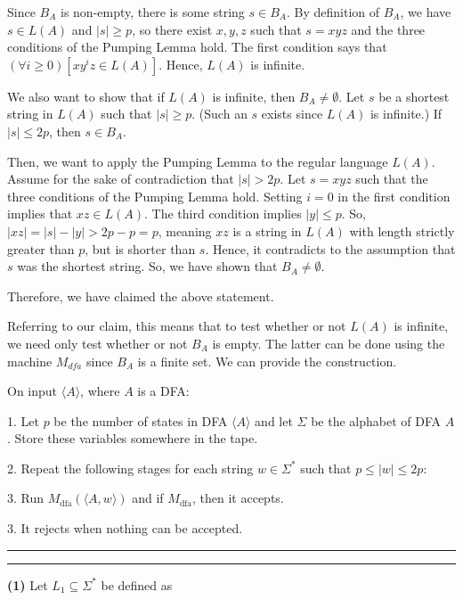 \documentclass[a4paper, 11pt]{article}
\newcommand{\question}[2] {\vspace{.25in} \hrule\vspace{0.5em}
	\noindent{\bf #1: #2} \vspace{0.5em}
	\hrule \vspace{.10in}}
\renewcommand{\part}[1] {\vspace{.10in} {\bf (#1)}}
\newcommand\tab[1][1cm]{\hspace*{#1}}
\begin{document}
	Since $B_A$ is non-empty, there is some string $s \in B_A$. By definition of $B_A$, we have $s \in L(A)$ and $|s| \geq p$, so there exist $x,y,z$ such that $s = xyz$ and the three conditions of the Pumping Lemma hold. The first condition says that $(\forall i \geq 0)[xy^iz \in L(A)]$. Hence, $L(A)$ is infinite.
	
	We also want to show that if $L(A)$ is infinite, then $B_A \neq \emptyset$. Let $s$ be a shortest string in $L(A)$ such that $|s| \geq p$. (Such an $s$ exists since $L(A)$ is infinite.) If $|s| \leq 2p$, then $s \in B_A$. 
	
	Then, we want to apply the Pumping Lemma to the regular language $L(A)$. Assume for the sake of contradiction that $|s| > 2p$. Let $s = xyz$ such that the three conditions of the Pumping Lemma hold. Setting $i = 0$ in the first condition implies that $xz \in L(A)$. The third condition implies $|y| \leq p$. So, $|xz| = |s| - |y| > 2p - p = p$, meaning $xz$ is a string in $L(A)$ with length strictly greater than $p$, but is shorter than $s$. Hence, it contradicts to the assumption that $s$ was the shortest string. So, we have shown that $B_A \neq \emptyset$. 
	
	Therefore, we have claimed the above statement.
	
	Referring to our claim, this means that to test whether or not $L(A)$ is infinite, we need only test whether or not $B_A$ is empty. The latter can be done using the machine $M_{dfa}$ since $B_A$ is a finite set. We can provide the construction. 
	
	On input $\langle A \rangle$, where $A$ is a DFA:
	
	1. Let $p$ be the number of states in DFA $\langle A \rangle$ and let $\Sigma$ be the alphabet of DFA $A$. Store these variables somewhere in the tape.
	
	2. Repeat the following stages for each string $w \in \Sigma^*$ such that $p \leq |w| \leq 2p$:
	
	\tab	3. Run $M_{\text{dfa}}(\langle A, w \rangle)$ and if $M_{\text{dfa}}$, then it accepts.
	
	3. It rejects when nothing can be accepted.
	
	
	\question{6}{Lucky 9}
	
	\part{1} Let $L_1 \subseteq \Sigma^*$ be defined as
	
\end{document}
